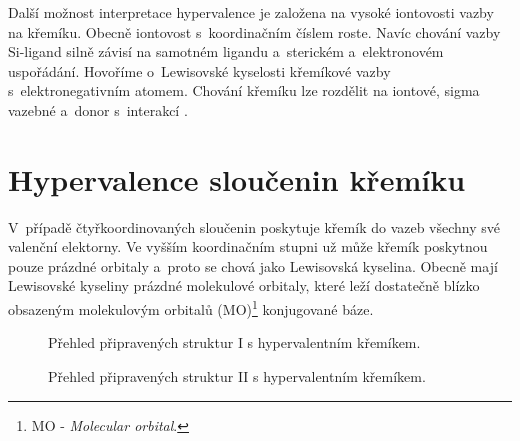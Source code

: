 \documentclass[
digital, %
table,   %
lof,     %
lot,     %
oneside,
]{fithesis3}
\renewcommand{\thesubfigure}{}
\begin{document}
Další možnost interpretace hypervalence je založena na vysoké iontovosti vazby na křemíku. Obecně iontovost s~koordinačním číslem roste.
Navíc chování vazby Si-ligand silně závisí na samotném ligandu a~sterickém a~elektronovém uspořádání. Hovoříme o~Lewisovské kyselosti křemíkové vazby s~elektronegativním atomem. Chování křemíku lze rozdělit na iontové, sigma vazebné a~donor s~interakcí \cite{Wagler2014}.\\

\section{Hypervalence sloučenin křemíku}\label{teorie_hypervalence}
V~případě čtyřkoordinovaných sloučenin poskytuje křemík do vazeb všechny své valenční elektorny. Ve vyšším koordinačním stupni už může křemík poskytnou pouze prázdné orbitaly a~proto se chová jako Lewisovská kyselina. Obecně mají Lewisovské kyseliny prázdné molekulové orbitaly, které leží dostatečně blízko obsazeným molekulovým orbitalů (MO)\footnote{MO - \textit{Molecular orbital}.} konjugované báze.
\renewcommand{\thesubfigure}{(\alph{subfigure})}
\begin{figure}
\begin{center}
\label{shrnuti_struktury_kremikI}
\caption{Přehled připravených struktur I s hypervalentním křemíkem.}
\end{center}
\end{figure}

\begin{figure}
\begin{center}
\label{shrnuti_struktury_kremikII}
\caption{Přehled připravených struktur II s hypervalentním křemíkem.}
\end{center}
\end{figure}
\renewcommand{\thesubfigure}{}
\end{document}
